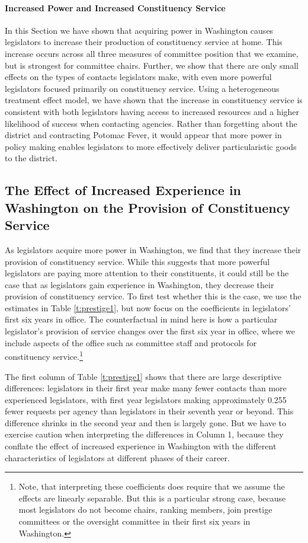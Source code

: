 \documentclass[12pt]{article}
\begin{document}
\paragraph{Increased Power and Increased Constituency Service} In this Section we have shown that acquiring power in Washington causes legislators to increase their production of constituency service at home.  This increase occurs across all three measures of committee position that we examine, but is strongest for committee chairs. Further, we show that there are only small effects on the types of contacts legislators make, with even more powerful legislators focused primarily on constituency service.  Using a heterogeneous treatment effect model, we have shown that the increase in constituency service is consistent with both legislators having access to increased resources and a higher likelihood of success when contacting agencies. Rather than forgetting about the district and contracting Potomac Fever, it would appear that more power in policy making enables legislators to more effectively deliver particularistic goods to the district.  

\subsection{The Effect of Increased Experience in Washington on the Provision of Constituency Service}\label{s:tenure}

As legislators acquire more power in Washington, we find that they increase their provision of constituency service.  While this suggests that more powerful legislators are paying more attention to their constituents, it could still be the case that as legislators gain experience in Washington, they decrease their provision of constituency service.  To first test whether this is the case, we use the estimates in Table \ref{t:prestige1}, but now focus on the coefficients in legislators' first six years in office.  The counterfactual in mind here is how a particular legislator's provision of service changes over the first six year in office, where we include aspects of the office such as committee staff and protocols for constituency service.\footnote{Note, that interpreting these coefficients does require that we assume the effects are linearly separable.  But this is a particular strong case, because most legislators do not become chairs, ranking members, join prestige committees or the oversight committee in their first six years in Washington. } 


The first column of Table \ref{t:prestige1} shows that there are large descriptive differences: legislators in their first year make many fewer contacts than more experienced legislators, with first year legislators making approximately 0.255 fewer requests per agency than legislators in their seventh year or beyond.  This difference shrinks in the second year and then is largely gone.  But we have to exercise caution when interpreting the differences in Column 1, because they conflate the effect of increased experience in Washington with the different characteristics of legislators at different phases of their career.    
\end{document}
